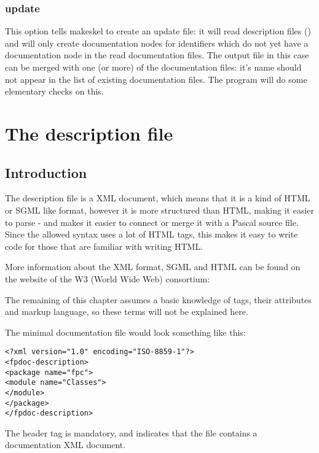 \subsection{update}
\label{suse:update}
This option tells makeskel to create an update file: it will read
description files () and will only create documentation nodes
for identifiers which do not yet have a documentation node in the read
documentation files. The output file in this case can be merged with one (or
more) of the documentation files: it's name should not appear in the list of
existing documentation files. The  program will do some
elementary checks on this.

\chapter{The description file}
\label{ch:descriptionfile}

\section{Introduction}
The description file is a XML document, which means that it is a kind of
HTML or SGML like format, however it is more structured than HTML, making it
easier to parse - and makes it easier to connect or merge it with a Pascal
source file. Since the allowed syntax uses a lot of HTML tags, this makes 
it easy to write code for those that are familiar with writing HTML.

More information about the XML format, SGML and HTML can be found on the 
website of the W3 (World Wide Web) consortium:  

The remaining of this chapter assumes a basic knowledge of tags, their
attributes and markup language, so these terms will not be explained here. 

The minimal documentation file would look something like this:
\begin{verbatim}
<?xml version="1.0" encoding="ISO-8859-1"?>
<fpdoc-description>
<package name="fpc">
<module name="Classes">
</module>
</package>
</fpdoc-description>
\end{verbatim}
The header  tag is mandatory, and indicates that the file contains a
documentation XML document.

